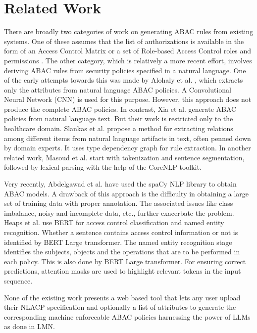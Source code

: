 \section{Related Work}
\label{sec:related}

There are broadly two categories of work on generating ABAC rules from existing systems. One of these assumes that the list of authorizations is available in the form of an Access Control Matrix or a set of Role-based Access Control roles and permissions \cite{xu_stoller}\cite{das_et_al}\cite{nakul}. 
The other category, which is relatively a more recent effort, involves deriving ABAC rules from security policies specified in a natural language. 
One of the early attempts towards this was made by Alohaly et al. \cite{AlohalyT019}, which extracts only the attributes from natural language ABAC policies. A Convolutional Neural Network (CNN) is used for this purpose. However, this approach does not produce the complete ABAC policies. In contrast, Xia et al. \cite{9995559} generate ABAC policies from natural language text. But their work is restricted only to the healthcare domain. 
Slankas et al. \cite{Slankas} propose a method for extracting relations among different items from natural language artifacts in text, often penned down by domain experts. It uses type dependency graph for rule extraction. 
In another related work, Masoud et al. \cite{masouddbsec2017} start with tokenization and sentence segmentation, followed by lexical parsing with the help of the CoreNLP toolkit. 


Very recently, Abdelgawad et al. \cite{Abdelgawad} have used the spaCy NLP library to obtain ABAC models. A drawback of this approach is the difficulty in obtaining a large set of training data with proper annotation. The associated issues like class imbalance, noisy and incomplete data, etc., further exacerbate the problem. Heaps et al. \cite{userstories} 
use BERT  for access control classification and named entity recognition.  Whether a sentence contains access control information or not is identified by BERT Large transformer. The named entity recognition stage identifies the subjects, objects and the operations that are to be performed in each policy. This is also done by BERT Large transformer. For ensuring correct predictions, attention masks are used to highlight relevant tokens in the input sequence.

None of the existing work presents a web based tool that lets any user upload their NLACP specification and optionally a list of attributes to generate the corresponding machine enforceable ABAC policies harnessing the power of LLMs as done in LMN.